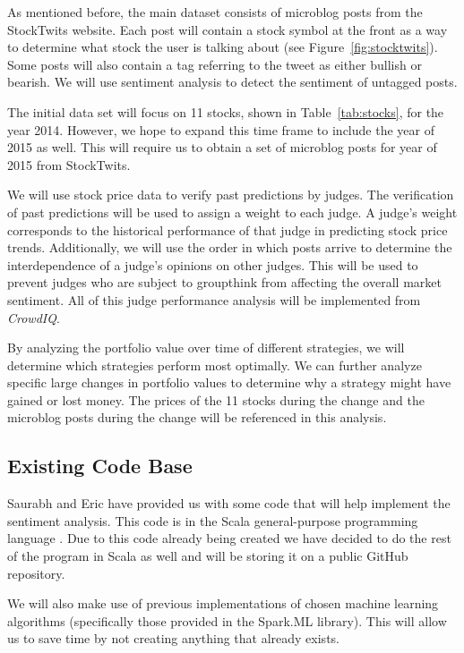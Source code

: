 As mentioned before, the main dataset consists of microblog posts from the StockTwits website. Each post will contain a stock symbol at the front as a way to determine what stock the user is talking about (see Figure~\ref{fig:stocktwits}). Some posts will also contain a tag referring to the tweet as either bullish or bearish. We will use sentiment analysis to detect the sentiment of untagged posts.

The initial data set will focus on 11 stocks, shown in Table~\ref{tab:stocks}, for the year 2014. However, we hope to expand this time frame to include the year of 2015 as well. This will require us to obtain a set of microblog posts for year of 2015 from StockTwits.

We will use stock price data to verify past predictions by judges. The verification of past predictions will be used to assign a weight to each judge. A judge's weight corresponds to the historical performance of that judge in predicting stock price trends. Additionally, we will use the order in which posts arrive to determine the interdependence of a judge's opinions on other judges. This will be used to prevent judges who are subject to groupthink from affecting the overall market sentiment. All of this judge performance analysis will be implemented from \textit{CrowdIQ}.

By analyzing the portfolio value over time of different strategies, we will determine which strategies perform most optimally. We can further analyze specific large changes in portfolio values to determine why a strategy might have gained or lost money. The prices of the 11 stocks during the change and the microblog posts during the change will be referenced in this analysis.

\subsection{Existing Code Base}

Saurabh and Eric have provided us with some code that will help implement the sentiment analysis. This code is in the Scala general-purpose programming language \cite{scala}. Due to this code already being created we have decided to do the rest of the program in Scala as well and will be storing it on a public GitHub repository.

We will also make use of previous implementations of chosen machine learning algorithms (specifically those provided in the Spark.ML library). This will allow us to save time by not creating anything that already exists.

